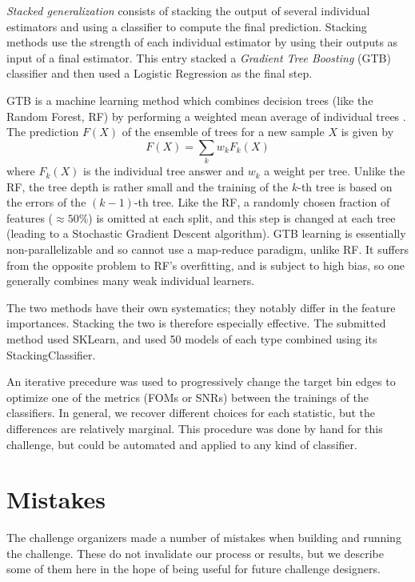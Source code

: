 \documentclass[twocolumn,twocolappendix]{aastex63}
\begin{document}
\emph{Stacked generalization} consists of stacking the output of several individual estimators and 
using a classifier to compute the final prediction. Stacking methods use the strength of each 
individual estimator by using their outputs as input of a final estimator.  This entry stacked
a \emph{Gradient Tree Boosting} (GTB) classifier and then used a Logistic Regression as the final step.

GTB is a machine learning method which combines decision trees (like the Random Forest, RF)
by performing a weighted mean average of individual trees \citep{Friedman:2002we,RefWorks:1634}. 
The prediction $F(X)$ of the ensemble of trees for a new sample $X$ is given by
\begin{equation}
F(X) = \sum_k w_k F_k(X)
\end{equation}
where $F_k(X)$ is the individual tree answer and $w_k$ a weight per tree. Unlike the RF, the 
tree depth is rather small and the training  of the $k$-th tree is based on the errors of the
$(k-1)$-th tree.  Like the RF, a randomly chosen fraction of features ($\approx 50\%$) is 
omitted at each split, and this step is changed at each tree (leading to a Stochastic Gradient Descent 
algorithm).  GTB learning is essentially non-parallelizable and so cannot use a map-reduce paradigm, 
unlike RF. It suffers from the opposite problem to RF's overfitting, and is subject
to high bias, so one generally combines many weak individual learners.

The two methods have their own systematics; they notably differ in the feature importances. Stacking 
the two is therefore especially effective.  The submitted method used {\sc SKLearn}, and used 50 models 
of each type combined using its {\sc StackingClassifier}.

An iterative precedure was used to progressively change the target bin edges to optimize one of the metrics (FOMs or SNRs) between the trainings of the classifiers. In general, we recover different choices for each statistic, but the differences are relatively marginal. This procedure was done by hand for this challenge, but could be automated and applied to any kind of classifier.



\section{Mistakes} \label{sec:mistakes}
The challenge organizers made a number of mistakes when building and running the challenge.
These do not invalidate our process or results, but we describe some of them here in the hope of
being useful for future challenge designers.
\end{document}
